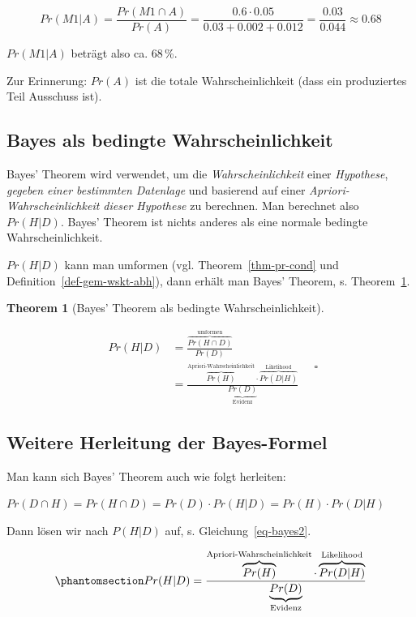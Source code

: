 \documentclass[
  ngerman,
  letterpaper,
  twoside,
  open=any]{scrbook}
\theoremstyle{definition}
\theoremstyle{plain}
\newtheorem{theorem}{Theorem}[chapter]
\theoremstyle{definition}
\theoremstyle{definition}
\theoremstyle{definition}
\theoremstyle{definition}
\theoremstyle{remark}
\begin{document}
\[Pr(M1|A) = \frac{Pr(M1 \cap A)}{Pr(A)} = \frac{0.6 \cdot 0.05}{0.03 + 0.002 + 0.012} = \frac{0.03}{0.044} \approx 0.68\]

\(Pr(M1|A)\) beträgt also ca. 68\,\%.

Zur Erinnerung: \(Pr(A)\) ist die totale Wahrscheinlichkeit (dass ein
produziertes Teil Ausschuss ist).

\subsection{Bayes als bedingte
Wahrscheinlichkeit}\label{bayes-als-bedingte-wahrscheinlichkeit}

Bayes' Theorem wird verwendet, um die \emph{Wahrscheinlichkeit} einer
\emph{Hypothese}, \emph{gegeben einer bestimmten Datenlage} und
basierend auf einer \emph{Apriori-Wahrscheinlichkeit dieser Hypothese}
zu berechnen. Man berechnet also \(Pr(H|D)\). Bayes' Theorem ist nichts
anderes als eine normale bedingte Wahrscheinlichkeit.

\(Pr(H| D)\) kann man umformen (vgl. Theorem~\ref{thm-pr-cond} und
Definition~\ref{def-gem-wskt-abh}), dann erhält man Bayes' Theorem, s.
Theorem~\ref{thm-bayes3}.

\begin{theorem}[Bayes' Theorem als bedingte
Wahrscheinlichkeit]\protect\hypertarget{thm-bayes3}{}\label{thm-bayes3}

\[\begin{aligned}
Pr(H|D) &=\frac{\overbrace{ Pr(H\cap D)}^\text{umformen}}{Pr(D)} \\  &= \frac{\overbrace{Pr(H)}^\text{Apriori-Wahrscheinlichkeit} \cdot \overbrace{Pr(D|H)}^\text{Likelihood}}{\underbrace{Pr(D)}_\text{Evidenz}}
\end{aligned}\quad \square\]

\end{theorem}

\subsection{Weitere Herleitung der
Bayes-Formel}\label{weitere-herleitung-der-bayes-formel}

Man kann sich Bayes' Theorem auch wie folgt herleiten:

\(Pr(D\cap H) = Pr(H \cap D) = Pr(D) \cdot Pr(H|D) = Pr(H) \cdot Pr(D|H)\)

Dann lösen wir nach \(P(H|D)\) auf, s. Gleichung~\ref{eq-bayes2}.

\begin{equation}\protect\phantomsection\label{eq-bayes2}{Pr(H|D) = \frac{\overbrace{Pr(H)}^\text{Apriori-Wahrscheinlichkeit} \cdot \overbrace{Pr(D|H)}^\text{Likelihood}}{\underbrace{Pr(D)}_\text{Evidenz}}}\end{equation}
\end{document}

